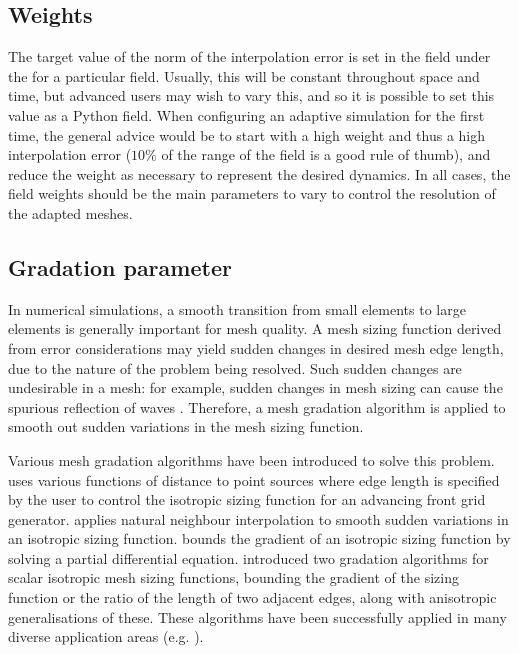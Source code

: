 \subsection{Weights} \label{sec:adaptivity_weights}
The target value of the norm of the interpolation error is set in the 
field under the  for a particular field. Usually, this
will be constant throughout space and time, but advanced users may wish to vary this, and so
it is possible to set this value as a Python field. When configuring an adaptive simulation
for the first time, the general advice would be to start with a high weight and thus a high
interpolation error ($10\%$ of the range of the field is a good rule of thumb), and reduce the weight as necessary to represent the desired dynamics.
In all cases, the field weights should be the main parameters to vary to control the resolution
of the adapted meshes.

\subsection{Gradation parameter} \label{sec:gradation_parameter}
In numerical simulations, a smooth transition from small elements to large elements is generally important for mesh quality. 
A mesh sizing function derived from error considerations may
yield sudden changes in desired mesh edge length, due to the
nature of the problem being resolved. Such sudden changes are undesirable
in a mesh:
for example, sudden changes in mesh sizing
can cause the spurious reflection of waves \citet{bazant1978,bangerth2001}.
Therefore, a mesh gradation algorithm
is applied to smooth out sudden variations in the mesh sizing function.

Various mesh gradation algorithms have been introduced to solve this problem.
\citet{lohner1996} uses various functions of distance to point sources where edge
length is specified by the user to control the isotropic sizing function for an
advancing front grid generator. \citet{owen2000} applies natural neighbour
interpolation to smooth sudden variations in an isotropic sizing function.
\citet{persson2006} bounds the gradient of an isotropic sizing function by
solving a partial differential equation. \citet{borouchaki1998} introduced two
gradation algorithms for scalar isotropic mesh sizing functions, bounding the
gradient of the sizing function or the ratio of the length of two adjacent
edges, along with anisotropic generalisations of these. These algorithms have
been successfully applied in many diverse application areas (e.g.
\citet{frey2004, alauzet2003, laug2002, lee2003}).

